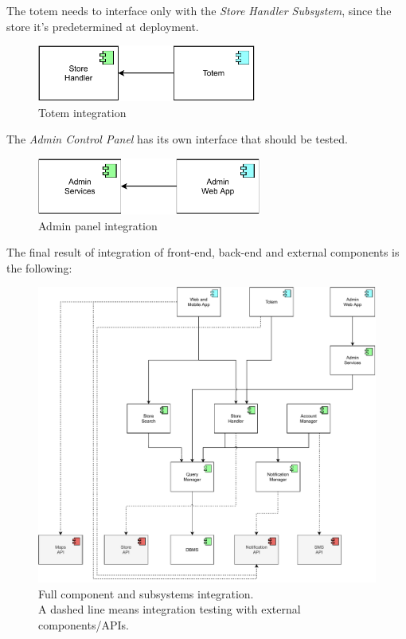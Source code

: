 The totem needs to interface only with the \emph{Store Handler Subsystem}, since the store it's predetermined at deployment.

\begin{figure}[H]
    \centering
    \includegraphics[height=5em]{images/draw.io/totem_integration.pdf}
    \caption{Totem integration}
    \label{fig:totem_integration}
\end{figure}

The \emph{Admin Control Panel} has its own interface that should be tested.

\begin{figure}[H]
    \centering
    \includegraphics[height=5em]{images/draw.io/admin_panel_integration.pdf}
    \caption{Admin panel integration}
    \label{fig:admin_panel_integration}
\end{figure}

The final result of integration of front-end, back-end and external components is the following:
\begin{figure}[H]
    \centering
    \includegraphics[width=0.8\linewidth]{images/draw.io/integration_full.pdf}
    \caption{Full component and subsystems integration.\\ A dashed line means integration testing with external components/APIs.}
    \label{fig:full_components_integration}
\end{figure}